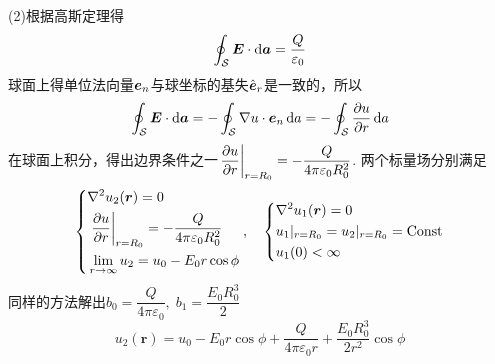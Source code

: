 \documentclass{mynote}
\begin{document}
\begin{solution}
    (2)根据高斯定理得
    \[
    \oint_{\mathcal{S}} \boldsymbol{E} \cdot \mathop{}\!\mathrm{d} \boldsymbol{a} = \frac{Q}{\varepsilon_0}    
    \]
    球面上得单位法向量$\boldsymbol{e}_n$与球坐标的基失$\hat{\boldsymbol{e}}_r$是一致的，所以
    \[
        \oint_{\mathcal{S}} \boldsymbol{E} \cdot \mathop{}\!\mathrm{d} \boldsymbol{a} = -\oint_{\mathcal{S}} \nabla u \cdot \boldsymbol{e}_n \mathop{}\!\mathrm{d} a = -\oint_{\mathcal{S}} \dfrac{\partial u}{\partial r} \mathop{}\!\mathrm{d} a
    \]
    在球面上积分，得出边界条件之一$\left. \dfrac{\partial u}{\partial r} \right|_{r=R_0} = -\dfrac{Q}{4\pi \varepsilon_0 R_0^2}$.
    两个标量场分别满足
    \[
    \left\{
        \begin{aligned}
            & \nabla^2 u_2(\boldsymbol{r}) = 0\\
            & \left. \dfrac{\partial u}{\partial r} \right|_{r=R_0} =  -\dfrac{Q}{4\pi \varepsilon_0 R_0^2} \\
            & \lim_{r\to \infty} u_2 = u_0 - E_0 r \cos \phi
        \end{aligned} 
    \right. ,\quad
    \left\{
        \begin{aligned}
            & \nabla^2 u_1(\boldsymbol{r}) = 0\\
            & u_1 |_{r=R_0} = u_2 |_{r = R_0} = \mathrm{Const} \\
            & u_1(0) < \infty
        \end{aligned} 
    \right.   
    \]
    同样的方法解出$b_0 = \dfrac{Q}{4\pi \varepsilon_0},\; b_1 = \dfrac{E_0 R_0^3}{2}$
    \[
        u_2(\bm{r}) = u_0 - E_0 r \cos \phi + \dfrac{Q}{4\pi \varepsilon_0 r} + \dfrac{E_0 R_0^3}{2r^2} \cos \phi
    \]
\end{solution}
\end{document}
